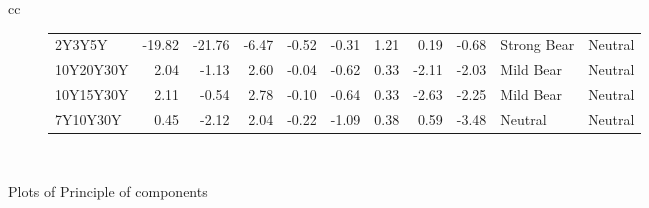 \documentclass[a4paper,oneside]{report}
\begin{document}
\begin{figure}[htbp]
\begin{tabular}[c]{cc}
\begin{subfigure}[c]{0.5\textwidth}
\begin{adjustbox}{max width=\textwidth}
\begin{tabular}{lrrrrrrrrll}
    2Y3Y5Y & -19.82 &   -21.76 &     -6.47 &  -0.52 & -0.31 &      1.21 &   0.19 &    -0.68 &  Strong Bear &         Neutral \\
 10Y20Y30Y &   2.04 &    -1.13 &      2.60 &  -0.04 & -0.62 &      0.33 &  -2.11 &    -2.03 &    Mild Bear &         Neutral \\
 10Y15Y30Y &   2.11 &    -0.54 &      2.78 &  -0.10 & -0.64 &      0.33 &  -2.63 &    -2.25 &    Mild Bear &         Neutral \\
  7Y10Y30Y &   0.45 &    -2.12 &      2.04 &  -0.22 & -1.09 &      0.38 &   0.59 &    -3.48 &      Neutral &         Neutral \\
\hline
\end{tabular}
\end{adjustbox}
 \end{subfigure}\\
 
 
 
\end{tabular}
 \caption{Plots of Principle of components}\label{fig:bubble plots}
 \end{figure}  
 
 
 

 
\end{document}
